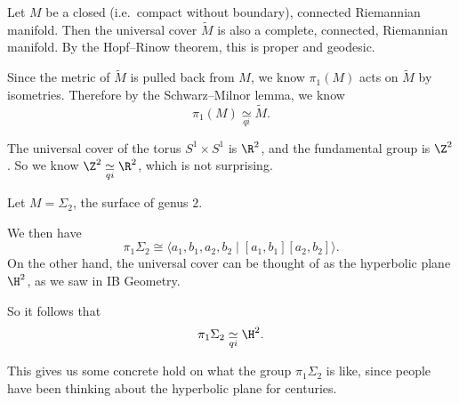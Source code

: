 \documentclass[a4paper]{article}
\newcommand{\qi}{\underset{qi}{\simeq}}
\begin{document}
\begin{eg}
  Let $M$ be a closed (i.e.\ compact without boundary), connected Riemannian manifold. Then the universal cover $\tilde{M}$ is also a complete, connected, Riemannian manifold. By the Hopf--Rinow theorem, this is proper and geodesic.

  Since the metric of $\tilde{M}$ is pulled back from $M$, we know $\pi_1(M)$ acts on $\tilde{M}$ by isometries. Therefore by the Schwarz--Milnor lemma, we know
  \[
     \pi_1(M) \qi \tilde{M}.
  \]
\end{eg}
\begin{eg}
  The universal cover of the torus $S^1 \times S^1$ is $\R^2$, and the fundamental group is $\Z^2$. So we know $\Z^2 \qi \R^2$, which is not surprising.
\end{eg}

\begin{eg}
  Let $M = \Sigma_2$, the surface of genus $2$.
  \begin{center}
  \end{center}
  We then have
  \[
    \pi_1 \Sigma_2 \cong \langle a_1, b_1, a_2, b_2 \mid [a_1, b_1][a_2, b_2]\rangle.
  \]
  On the other hand, the universal cover can be thought of as the hyperbolic plane $\H^2$, as we saw in IB Geometry. %

  So it follows that
  \[
    \pi_1 \Sigma_2 \qi \H^2.
  \]
\end{eg}
This gives us some concrete hold on what the group $\pi_1 \Sigma_2$ is like, since people have been thinking about the hyperbolic plane for centuries.
\end{document}
